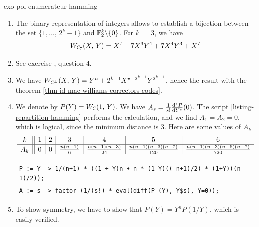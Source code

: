  
\begin{correction}{exo-pol-enumerateur-hamming}
\begin{enumerate}
\item The binary representation of integers allows to establish a bijection between the set $ \{1, \ldots, \, 2^k-1\} $ and $ \mathbb{F}_2^k \backslash \{0\} $. For $ k = $ 3, we have
\begin{equation*}
W_{\mathcal{C}_7} (X, \, Y) = X^7 + 7 X^3Y^4 + 7 X^4 Y^3 + X^7
\end{equation*}
 
\item See exercise , question 4.
\item We have $ W_{\mathcal{C}^\bot} (X, \, Y) = Y^n + 2^{k-1} X^{n-2^{k-1}} Y^{2^{k-1}} $, hence the result with the theorem \ref{thm-id-mac-williams-correctors-codes}.
\item We denote by $ P (Y) = W_{\mathcal{C}} (1, \, Y) $. We have $ A_s = \frac{1}{s!} \frac{\mathrm{d}^s P}{\mathrm{d} Y^s} (0) $. The script \Maple{} \ref{listing-repartition-hamming} performs the calculation, and we find $ A_1 = A_2 = 0 $, which is logical, since the minimum distance is 3. Here are some values of $ A_k $
\begin{equation*}
\begin{array}{c || c | c | c | c | c | c} k & 1 & 2 & 3 & 4 & 5 & 6 \\\hline A_k & 0 & 0 & \frac{n (n -1)}{6} & \frac{n (n-1) (n-3)}{24} & \frac{n (n-1) (n-3) (n-7)}{120} & \frac{n (n-1) (n-3) (n-5) (n-7)}{720} \end{array}
\end{equation*}
 
\begin{listing} 
\begin{footnotesize} 
{\upshape
\begin{tabular}{l} \texttt{P := Y -> 1/(n+1) * ((1 + Y){\hatverb}n + n * (1-Y){\hatverb}(( n+1)/2) * (1+Y){\hatverb}((n-1)/2));} \\
\texttt{A := s -> factor (1/(s!) * eval(diff(P (Y), Y\$s), Y=0));} \\
\end{tabular}
}
\end{footnotesize}
\caption{Calculation of $ A_k $ for a Hamming code}
\label{listing-repartition-hamming}
\end{listing}
 
\item To show symmetry, we have to show that $ P (Y) = Y^n P (1/Y) $, which is easily verified.
\end{enumerate}
\end{correction}
 
